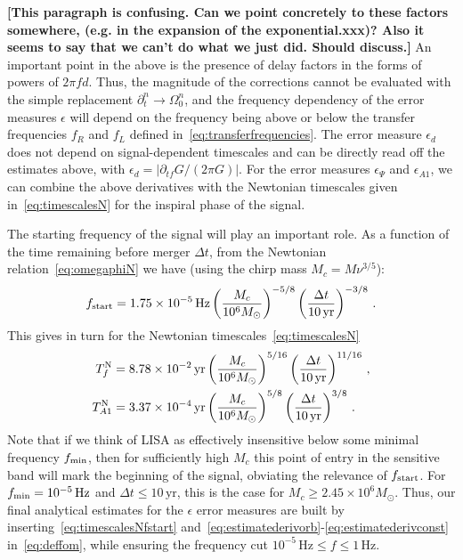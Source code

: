 \documentclass[aps,showpacs,twocolumn,
prd,superscriptaddress,nofootinbib]{revtex4-1}
\newcommand{\be}{\begin{equation}}
\newcommand{\ee}{\end{equation}}
\newcommand{\Hz}{\,\mathrm{Hz}}
\newcommand{\yr}{\,\mathrm{yr}}
\newcommand{\Msol}{M_{\odot}}
\newcommand{\Mchirp}{M_{c}}
\newcommand{\Tf}{T_{f}}
\newcommand{\jgb}[1]{{\color{DarkGreen} #1}}
\begin{document}
\jgb{\bf[This paragraph is confusing.  Can we point concretely to these factors somewhere, (e.g. in the expansion of the exponential.xxx)? Also it seems to say that we can't do what we just did. Should discuss.]} An important point in the above is the presence of delay factors in the forms of powers of $2\pi f d$. Thus, the magnitude of the corrections cannot be evaluated with the simple replacement $\partial_{t}^{n} \rightarrow \Omega_{0}^{n}$, and the frequency dependency of the error measures $\epsilon$ will depend on the frequency being above or below the transfer frequencies $f_{R}$ and $f_{L}$ defined in~\eqref{eq:transferfrequencies}. The error measure $\epsilon_{d}$ does not depend on signal-dependent timescales and can be directly read off the estimates above, with $\epsilon_{d} = |\partial_{tf}G/(2\pi G)|$. For the error measures $\epsilon_{\Psi}$ and $\epsilon_{A1}$, we can combine the above derivatives with the Newtonian timescales given in~\eqref{eq:timescalesN} for the inspiral phase of the signal.

The starting frequency of the signal will play an important role. As a function of the time remaining before merger $\Delta t$, from the Newtonian relation~\eqref{eq:omegaphiN} we have (using the chirp mass $\Mchirp = M \nu^{3/5}$):
\be\label{eq:fstartN}
	f_{\rm start} = 1.75\times 10^{-5} \Hz \left( \frac{\Mchirp}{10^{6}M_{\odot}} \right)^{-5/8} \left( \frac{\Delta t}{10 \yr} \right)^{-3/8} \,.
\ee
This gives in turn for the Newtonian timescales~\eqref{eq:timescalesN}
\begin{subequations}\label{eq:timescalesNfstart}
\begin{align}
	\Tf^{\rm N} &= 8.78\times10^{-2}\yr \left( \frac{\Mchirp}{10^{6}M_{\odot}} \right)^{5/16} \left( \frac{\Delta t}{10 \yr} \right)^{11/16} \,, \\
	T_{A1}^{\rm N} &= 3.37\times10^{-4}\yr \left( \frac{\Mchirp}{10^{6}M_{\odot}} \right)^{5/8} \left( \frac{\Delta t}{10 \yr} \right)^{3/8} \,.
\end{align}
\end{subequations}
Note that if we \jgb{think of LISA as effectively insensitive below some minimal frequency $f_{\rm min}$, then for sufficiently high $\Mchirp$ this point of entry in the sensitive band will mark the beginning of the signal, obviating the relevance of $f_{\rm start}$}. For $f_{\rm min} = 10^{-5}\Hz$ and $\Delta t \leq 10\yr$, this is the case for $\Mchirp \geq 2.45\times 10^{6}\Msol $. Thus, our final analytical estimates for the $\epsilon$ error measures are built by inserting~\eqref{eq:timescalesNfstart} and~\eqref{eq:estimatederivorb}-\eqref{eq:estimatederivconst} in~\eqref{eq:deffom}, while ensuring the frequency cut $10^{-5}\Hz \leq f \leq 1\Hz$.
\end{document}
